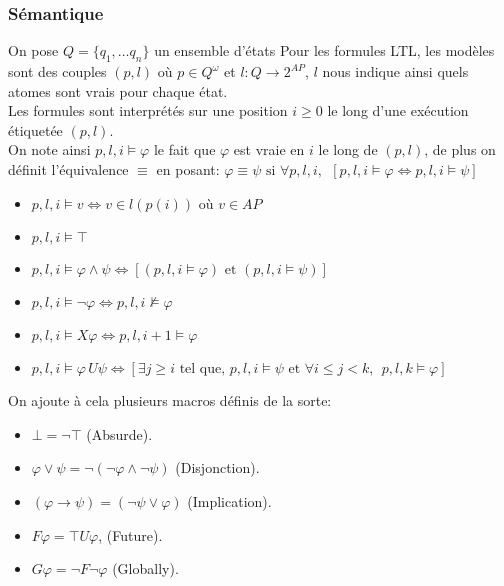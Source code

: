 \documentclass[12pt,a4paper]{article}
\theoremstyle{plain}
\theoremstyle{definition}
\begin{document}
\subsubsection{Sémantique}
On pose $Q=\{q_1, \dots q_n\}$ un ensemble d'états  Pour les formules LTL, les modèles sont des couples $(p, l)$ où $p \in Q^\omega$ et $l : Q \to 2^{AP}$, $l$ nous indique ainsi quels atomes sont vrais  pour chaque état. \\
Les formules sont interprétés sur une position $i \geq 0$ le long d'une exécution étiquetée $(p, l)$. \\
On note ainsi $p, l, i \models \varphi$ le fait que $\varphi$ est vraie en $i$ le long de $(p, l)$, de plus on définit l'équivalence $\equiv$ en posant: $\varphi \equiv \psi \textrm{ si } \forall p,l,i, \:\:[p,l,i \models \varphi \Leftrightarrow p,l,i \models \psi]$
\begin{itemize}
	\item[] $p, l, i \models v \Leftrightarrow v \in l(p(i))$ où $v \in AP$
	\item[] $p,l,i \models \top$
	\item[] $p, l, i \models \varphi \land \psi \Leftrightarrow [(p,l,i \models \varphi) \textrm{ et } (p,l,i \models \psi)]$
	\item[] $p,l,i \models \lnot \varphi \Leftrightarrow p,l,i \not \models \varphi$
	\item[] $p,l,i \models X\varphi \Leftrightarrow p,l,i+1 \models \varphi$
	\item[] $p,l,i \models \varphi\, U \psi \Leftrightarrow [\exists j \geq i\textrm{ tel que, } p,l,i \models \psi \textrm{ et } \forall i \leq j < k, \:\: p,l,k\models \varphi]$
\end{itemize}
\leavevmode \newline 
On ajoute à cela plusieurs macros définis de la sorte:
\begin{itemize}
	\item[] $\bot = \lnot \top$ (Absurde).
	\item[] $\varphi \lor \psi = \lnot (\lnot \varphi \land \lnot \psi)$ (Disjonction).
	\item[] $(\varphi \to \psi) = (\lnot \psi \lor \varphi)$ (Implication).
	\item[] $F\varphi = \top U \varphi$, (Future).
	\item[] $G\varphi = \lnot F \lnot \varphi$ (Globally).

\end{itemize}
\end{document}
